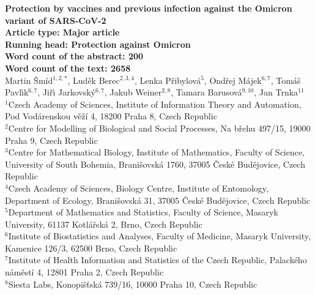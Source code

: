 \documentclass[a4paper,12pt]{article}
\begin{document}
\doublespacing

{\noindent \Large\bf Protection by vaccines and previous infection against the Omicron variant of SARS-CoV-2 \\[2ex]
{\normalsize Article type: Major article}\\[1ex]
{\normalsize Running head: Protection against Omicron}\\[1ex]
{\normalsize Word count of the abstract: 200} \\[1ex]
{\normalsize Word count of the text: 2658}}\\[2ex] %
{\large Martin \v{S}m\'id$^{1,2,*}$, Lud\v{e}k Berec$^{2,3,4}$,  Lenka P\v{r}ibylov\'a$^5$, Ond\v{r}ej M\'ajek$^{6,7}$, Tom\'a\v{s} Pavl\'{\i}k$^{6,7}$, Ji\v{r}\'{\i} Jarkovsk\'y$^{6,7}$, Jakub Weiner$^{2,8}$, Tamara Barusov\'{a}$^{9,10}$, Jan Trnka$^{11}$} \\[2ex]
$^1$Czech Academy of Sciences, Institute of Information Theory and Automation, Pod Vodárenskou věží 4, 18200 Praha 8, Czech Republic \\[1ex]
$^2$Centre for Modelling of Biological and Social Processes, Na břehu 497/15, 19000 Praha 9, Czech Republic \\[1ex] 
$^3$Centre for Mathematical Biology, Institute of Mathematics, Faculty of Science,  University of South Bohemia, Branišovská 1760, 37005 České Budějovice, Czech Republic \\[1ex]
$^4$Czech Academy of Sciences, Biology Centre, Institute of Entomology, Department of Ecology, Branišovská 31, 37005 České Budějovice, Czech Republic \\[1ex]
$^5$Department of Mathematics and Statistics, Faculty of Science, Masaryk University, 61137 Kotl\'a\v{r}sk\'a 2, Brno, Czech Republic \\[1ex]
$^6$Institute of Biostatistics and Analyses, Faculty of Medicine, Masaryk University, Kamenice 126/3, 62500 Brno, Czech Republic \\[1ex]
$^7$Institute of Health Information and Statistics of the Czech Republic, Palackého náměstí 4, 12801 Praha 2, Czech Republic \\[1ex] 
$^8$Siesta Labs, Konopišťská 739/16, 10000 Praha 10, Czech Republic \\[1ex] 
\end{document}
